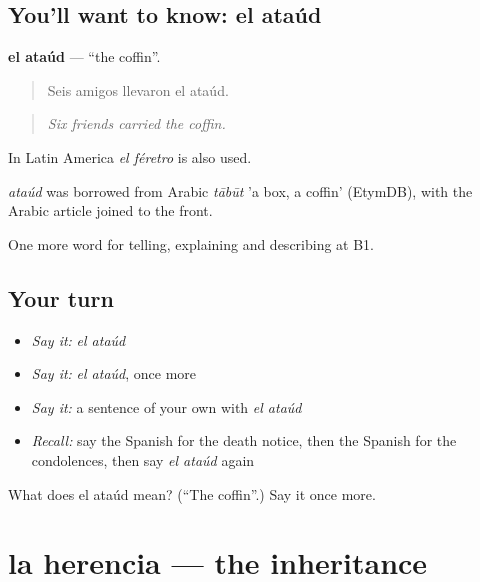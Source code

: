 \subsection*{You'll want to know: el ataúd}
\textbf{el ataúd} — \textquotedblleft{}the coffin\textquotedblright{}.

\begin{quote}
Seis amigos llevaron el ataúd.
\end{quote}

\begin{quote}
\emph{Six friends carried the coffin.}
\end{quote}

In Latin America \emph{el féretro} is also used.

\begin{cousinweb}
\emph{ataúd} was borrowed from Arabic \emph{tābūt} 'a box, a coffin' (EtymDB), with the Arabic article joined to the front.
\end{cousinweb}

\begin{grammarlens}[title={What you've built}]
One more word for telling, explaining and describing at B1.
\end{grammarlens}

\subsection*{Your turn}
\begin{itemize}
\raggedright
  \item \emph{Say it:} \emph{el ataúd}
  \item \emph{Say it:} \emph{el ataúd}, once more
  \item \emph{Say it:} a sentence of your own with \emph{el ataúd}
  \item \emph{Recall:} say the Spanish for the death notice, then the Spanish for the condolences, then say \emph{el ataúd} again
\end{itemize}

\begin{tcolorbox}[breakable,colback=teal!4,colframe=teal!35!black,title={Before you move on}]
What does el ataúd mean? (\textquotedblleft{}The coffin\textquotedblright{}.) Say it once more.
\end{tcolorbox}
\section[la herencia]{la herencia — the inheritance}

